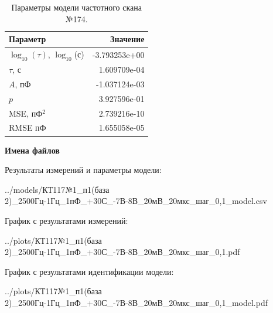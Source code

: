 \begin{table}[!ht]
    \centering
    \caption{Параметры модели частотного скана №174.}
    \begin{tabular}{|l|r|}
        \hline
        Параметр                                       & Значение                  \\ \hline
        $\log_{10}(\tau)$, $\log_{10}$(с)              & -3.793253e+00             \\ \hline
        $\tau$, с                                      & 1.609709e-04              \\ \hline
        $A$, пФ                                        & -1.037124e-03             \\ \hline
        $p$                                            & 3.927596e-01              \\ \hline
        MSE, пФ$^2$                                    & 2.739216e-10              \\ \hline
        RMSE пФ                                        & 1.655058e-05              \\ \hline
    \end{tabular}
    \label{table:frequency_scan_model_174}
\end{table}

\textbf{Имена файлов}

Результаты измерений и параметры модели:

\scriptsize../models/КТ117№1\_п1(база 2)\_2500Гц-1Гц\_1пФ\_+30С\_-7В-8В\_20мВ\_20мкс\_шаг\_0,1\_model.csv
\normalsize

График с результатами измерений:

\scriptsize../plots/КТ117№1\_п1(база 2)\_2500Гц-1Гц\_1пФ\_+30С\_-7В-8В\_20мВ\_20мкс\_шаг\_0,1.pdf
\normalsize

График с результатами идентификации модели:

\scriptsize../plots/КТ117№1\_п1(база 2)\_2500Гц-1Гц\_1пФ\_+30С\_-7В-8В\_20мВ\_20мкс\_шаг\_0,1\_model.pdf
\normalsize


